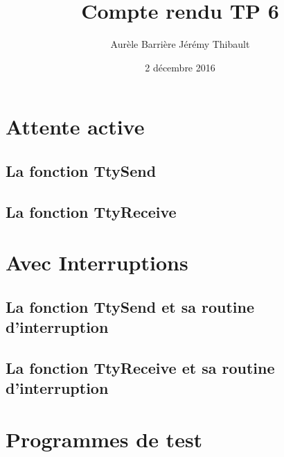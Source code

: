 \documentclass{article}
\title{Compte rendu TP 6}
\author{Aurèle Barrière \quad Jérémy Thibault}
\date{2 décembre 2016}
\begin{document}
\maketitle

\section{Attente active}
\subsection{La fonction TtySend}

\subsection{La fonction TtyReceive}


\section{Avec Interruptions}
\subsection{La fonction TtySend et sa routine d'interruption}

\subsection{La fonction TtyReceive et sa routine d'interruption}

\section{Programmes de test}
\end{document}
